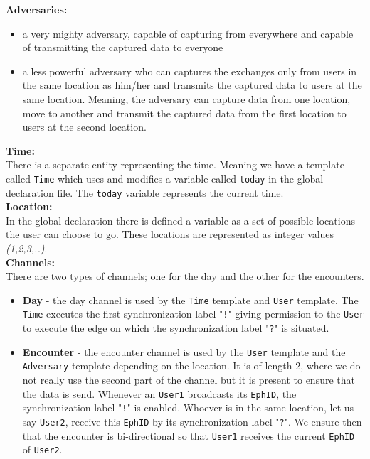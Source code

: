 \documentclass[a4paper, twocolumn]{article}
\begin{document}
\noindent \textbf{Adversaries:}
\begin{itemize}
    \item a very mighty adversary, capable of capturing from everywhere and capable of transmitting the captured data to everyone
    \item a less powerful adversary who can captures the exchanges only from users in the same location as him/her and transmits the captured data to users at the same location. Meaning, the adversary can capture data from one location, move to another and transmit the captured data from the first location to users at the second location.
\end{itemize}

\noindent \textbf{Time:}\\
There is a separate entity representing the time. Meaning we have a template called \texttt{Time} which uses and modifies a variable called \texttt{today} in the global declaration file. The \texttt{today} variable represents the current time.\\

\noindent \textbf{Location:}\\
In the global declaration there is defined a variable as a set of possible locations the user can choose to go. These locations are represented as integer values \textit{(1,2,3,..)}.\\

\noindent \textbf{Channels:}\\
There are two types of channels; one for the day and the other for the encounters.
\begin{itemize}
    \item \textbf{Day} - the day channel is used by the \texttt{Time} template and \texttt{User} template. The \texttt{Time} executes the first synchronization label "\texttt{!}" giving permission to the \texttt{User} to execute the edge on which the synchronization label "\texttt{?}" is situated.
    \item \textbf{Encounter} - the encounter channel is used by the \texttt{User} template and the \texttt{Adversary} template depending on the location. It is of length 2, where we do not really use the second part of the channel but it is present to ensure that the data is send. Whenever an \texttt{User1} broadcasts its \texttt{EphID}, the synchronization label "\texttt{!}" is enabled. Whoever is in the same location, let us say \texttt{User2}, receive this \texttt{EphID} by its synchronization label "\texttt{?}". We ensure then that the encounter is bi-directional so that \texttt{User1} receives the current \texttt{EphID} of \texttt{User2}.
\end{itemize}
\end{document}
